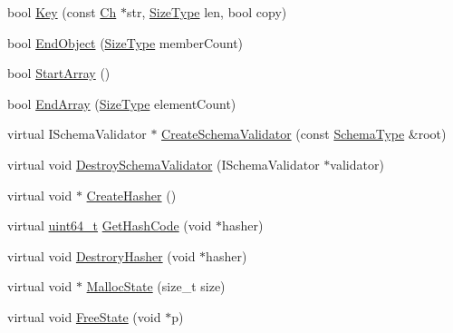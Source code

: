 \begin{DoxyCompactItemize}
\item 
bool \mbox{\hyperlink{classrapidjson_1_1_generic_schema_validator_af2ad6b4fb9837b90643da7cdd62e413b}{Key}} (const \mbox{\hyperlink{classrapidjson_1_1_generic_schema_validator_ab5b7093443e29cf66eb7cf47f3d8583d}{Ch}} $\ast$str, \mbox{\hyperlink{namespacerapidjson_a44eb33eaa523e36d466b1ced64b85c84}{Size\+Type}} len, bool copy)
\item 
bool \mbox{\hyperlink{classrapidjson_1_1_generic_schema_validator_ae3d4ceb7937a1a6ac3702c29e9243128}{End\+Object}} (\mbox{\hyperlink{namespacerapidjson_a44eb33eaa523e36d466b1ced64b85c84}{Size\+Type}} member\+Count)
\item 
bool \mbox{\hyperlink{classrapidjson_1_1_generic_schema_validator_a615b93b84c732e405f3847c7d789acf8}{Start\+Array}} ()
\item 
bool \mbox{\hyperlink{classrapidjson_1_1_generic_schema_validator_a98a80c23569edb89af722c124a136b49}{End\+Array}} (\mbox{\hyperlink{namespacerapidjson_a44eb33eaa523e36d466b1ced64b85c84}{Size\+Type}} element\+Count)
\item 
virtual I\+Schema\+Validator $\ast$ \mbox{\hyperlink{classrapidjson_1_1_generic_schema_validator_ae5b23d65482201d75072b958308d9d7b}{Create\+Schema\+Validator}} (const \mbox{\hyperlink{classrapidjson_1_1_generic_schema_validator_a0619c9faf3014ef141d1c6d05ae04ddc}{Schema\+Type}} \&root)
\item 
virtual void \mbox{\hyperlink{classrapidjson_1_1_generic_schema_validator_aec8a2e41bc8185df35ebf9ebedb52355}{Destroy\+Schema\+Validator}} (I\+Schema\+Validator $\ast$validator)
\item 
virtual void $\ast$ \mbox{\hyperlink{classrapidjson_1_1_generic_schema_validator_aec2362f03fb6edc575d9bb50d4f99c94}{Create\+Hasher}} ()
\item 
virtual \mbox{\hyperlink{stdint_8h_aec6fcb673ff035718c238c8c9d544c47}{uint64\+\_\+t}} \mbox{\hyperlink{classrapidjson_1_1_generic_schema_validator_a8d24483082f9b4b2b3f35bff78c66529}{Get\+Hash\+Code}} (void $\ast$hasher)
\item 
virtual void \mbox{\hyperlink{classrapidjson_1_1_generic_schema_validator_af7620c515a7ea2f75ff300cfbf9916cf}{Destrory\+Hasher}} (void $\ast$hasher)
\item 
virtual void $\ast$ \mbox{\hyperlink{classrapidjson_1_1_generic_schema_validator_a73d58da18b6e77665daaa977852f205c}{Malloc\+State}} (size\+\_\+t size)
\item 
virtual void \mbox{\hyperlink{classrapidjson_1_1_generic_schema_validator_acd4ac0e7042c9ab63e5b9e443dbc0d14}{Free\+State}} (void $\ast$p)
\end{DoxyCompactItemize}

